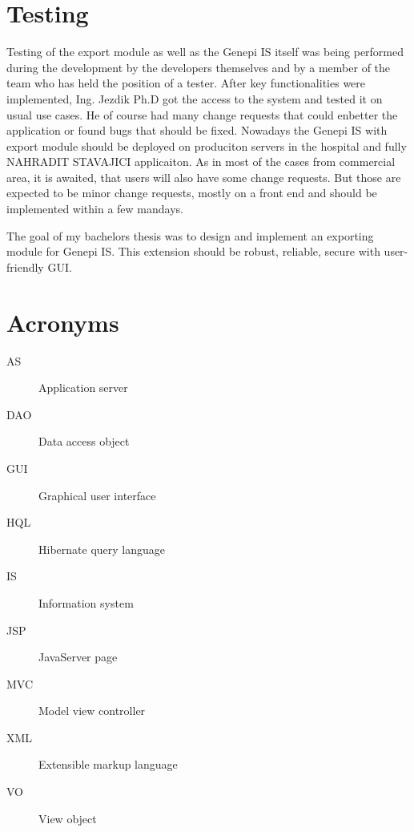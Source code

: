 \documentclass[thesis=B,english]{FITthesis}[2012/10/20]
\begin{document}
\chapter{Testing}
Testing of the export module as well as the Genepi IS itself was being performed during the development by the developers themselves and by a member of the team who has held the position of a tester. After key  functionalities were implemented, Ing. Jezdik Ph.D got the access to the system and tested it on usual use cases. He of course had many change requests that could enbetter the application or found bugs that should be fixed. Nowadays the Genepi IS with export module should be deployed on produciton servers in the hospital and fully NAHRADIT STAVAJICI applicaiton. As in most of the cases from commercial area, it is awaited, that users will also have some change requests. But those are expected to be minor change requests, mostly on a front end and should be implemented within a few mandays.
\begin{conclusion}
The goal of my bachelors thesis was to design and implement an exporting module for Genepi IS. This extension should be robust, reliable, secure with user-friendly GUI. 
\end{conclusion}




\appendix

\chapter{Acronyms}
\begin{description}
	\item[AS] Application server
	\item[DAO] Data access object
	\item[GUI] Graphical user interface
	\item[HQL] Hibernate query language
	\item[IS] Information system
	\item[JSP] JavaServer page
	\item[MVC] Model view controller
	\item[XML] Extensible markup language
	\item[VO] View object
\end{description}



\end{document}

